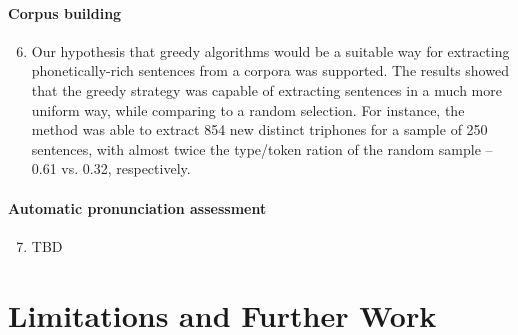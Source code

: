 \paragraph*{Corpus building}
  \begin{enumerate}
    \setcounter{enumi}{5}
    \item Our hypothesis that greedy algorithms would be a suitable way for extracting phonetically-rich sentences from a corpora was supported. The results showed that the greedy strategy was capable of extracting sentences in a much more uniform way, while comparing to a random selection. For instance, the method was able to extract 854 new distinct triphones for a sample of 250 sentences, with almost twice the type/token ration of the random sample -- 0.61 vs. 0.32, respectively.
  \end{enumerate}

\paragraph*{Automatic pronunciation assessment}
  \begin{enumerate}
    \setcounter{enumi}{6}
    \item TBD
  \end{enumerate}

\section*{Limitations and Further Work}\label{sec:limitations-further}

